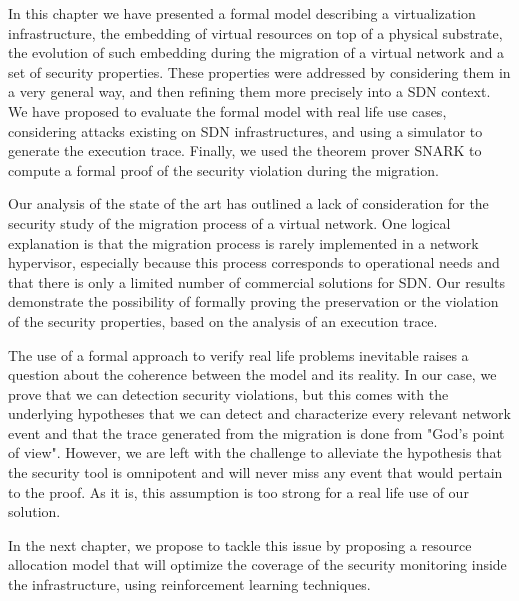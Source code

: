 In this chapter we have presented a formal model describing a virtualization infrastructure, the embedding of virtual resources on top of a physical substrate, the evolution of such embedding during the migration of a virtual network and a set of security properties. These properties were addressed by considering them in a very general way, and then refining them more precisely into a SDN context. We have proposed to evaluate the formal model with real life use cases, considering attacks existing on SDN infrastructures, and using a simulator to generate the execution trace. Finally, we used the theorem prover SNARK to compute a formal proof of the security violation during the migration.

Our analysis of the state of the art has outlined a lack of consideration for the security study of the migration process of a virtual network.
One logical explanation is that the migration process is rarely implemented in a network hypervisor, especially because this process corresponds to operational needs and that there is only a limited number of commercial solutions for SDN.
Our results demonstrate the possibility of formally proving the preservation or the violation of the security properties, based on the analysis of an execution trace.

The use of a formal approach to verify real life problems inevitable raises a question about the coherence between the model and its reality.
In our case, we prove that we can detection security violations, but this comes with the underlying hypotheses that we can detect and characterize every relevant network event and that the trace generated from the migration is done from "God's point of view". However, we are left with the challenge to alleviate the hypothesis that the security tool is omnipotent and will never miss any event that would pertain to the proof. As it is, this assumption is too strong for a real life use of our solution.

In the next chapter, we propose to tackle this issue by proposing a resource allocation model that will optimize the coverage of the security monitoring inside the infrastructure, using reinforcement learning techniques.